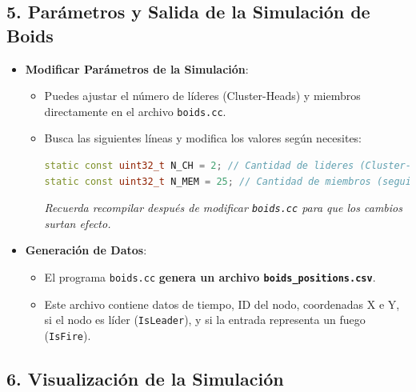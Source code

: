 \documentclass{article}
\begin{document}
\subsection*{\textbf{5. Parámetros y Salida de la Simulación de Boids}}

\begin{itemize}
    \item \textbf{Modificar Parámetros de la Simulación}:
    \begin{itemize}
        \item Puedes ajustar el número de líderes (Cluster-Heads) y miembros directamente en el archivo \texttt{boids.cc}.
        \item Busca las siguientes líneas y modifica los valores según necesites:
        \begin{lstlisting}[language=C++]
static const uint32_t N_CH = 2; // Cantidad de lideres (Cluster-Heads)
static const uint32_t N_MEM = 25; // Cantidad de miembros (seguidores)
        \end{lstlisting}
        \textit{Recuerda recompilar después de modificar \texttt{boids.cc} para que los cambios surtan efecto.}
    \end{itemize}
    \item \textbf{Generación de Datos}:
    \begin{itemize}
        \item El programa \texttt{boids.cc} \textbf{genera un archivo \texttt{boids\_positions.csv}}.
        \item Este archivo contiene datos de tiempo, ID del nodo, coordenadas X e Y, si el nodo es líder (\texttt{IsLeader}), y si la entrada representa un fuego (\texttt{IsFire}).
    \end{itemize}
\end{itemize}

\subsection*{\textbf{6. Visualización de la Simulación}}
\end{document}
